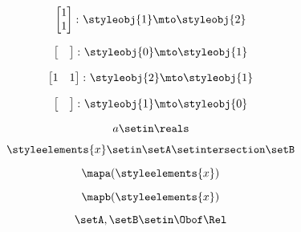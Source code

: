 \begin{forslides}
    \begin{equation}
        \label{eq:parallelism-111}
        \begin{bmatrix}
            1 \\
            1
        \end{bmatrix}
        \colon \styleobj{1} \mto \styleobj{2}
    \end{equation}

    \begin{equation}
        \label{eq:parallelism-112}
        \begin{bmatrix}
            \quad
        \end{bmatrix}
        \colon \styleobj{0} \mto \styleobj{1}
    \end{equation}

    \begin{equation}
        \label{eq:parallelism-113}
        \begin{bmatrix}
            1 & 1
        \end{bmatrix}
        \colon \styleobj{2} \mto \styleobj{1}
    \end{equation}

    \begin{equation}
        \label{eq:parallelism-114}
        \begin{bmatrix}
            \quad
        \end{bmatrix}
        \colon \styleobj{1} \mto \styleobj{0}
    \end{equation}

    \begin{equation}
        \label{eq:parallelism-115}
        a \setin \reals
    \end{equation}


    \begin{equation}
        \label{eq:parallelism-116}
        \styleelements{x}\setin \setA\setintersection \setB
    \end{equation}

    \begin{equation}
        \label{eq:parallelism-117}
        \mapa(\styleelements{x})
    \end{equation}

    \begin{equation}
        \label{eq:parallelism-118}
        \mapb(\styleelements{x})
    \end{equation}

    \begin{equation}
        \label{eq:parallelism-119}
        \setA,\setB\setin \Obof\Rel
    \end{equation}


\end{forslides}
